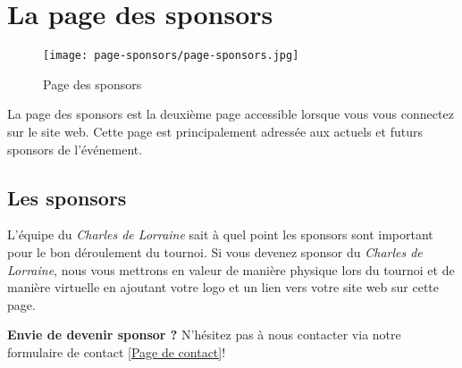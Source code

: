 \section{La page des sponsors}

\begin{figure}[H]
\centering
\texttt{[image: page-sponsors/page-sponsors.jpg]}
\caption{Page des sponsors}
\end{figure}

La page des sponsors est la deuxième page accessible lorsque vous vous connectez sur le site web. Cette page est principalement adressée aux actuels et futurs sponsors de l'événement.

\subsection{Les sponsors}

L'équipe du \textit{Charles de Lorraine} sait à quel point les sponsors sont important
pour le bon déroulement du tournoi. Si vous devenez sponsor du \textit{Charles de
Lorraine}, nous vous mettrons en valeur de manière physique lors du tournoi et
de manière virtuelle en ajoutant votre logo et un lien vers votre site web sur
cette page. \newline

\textbf{Envie de devenir sponsor ?} N'hésitez pas à nous contacter via notre
formulaire de contact \ref{Page de contact}! \newline
